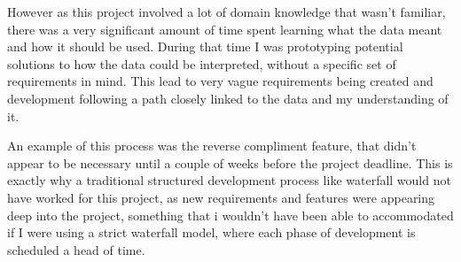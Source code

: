 However as this project involved a lot of domain knowledge that wasn't familiar, there was a very significant amount of time spent learning what the data meant and how it should be used. During that time I was prototyping potential solutions to how the data could be interpreted, without a specific set of requirements in mind. This lead to very vague requirements being created and development following a path closely linked to the data and my understanding of it. 

An example of this process was the reverse compliment feature, that didn't appear to be necessary until a couple of weeks before the project deadline. This is exactly why a traditional structured development process like waterfall would not have worked for this project, as new requirements and features were appearing deep into the project, something that i wouldn't have been able to accommodated if I were using a strict waterfall model, where each phase of development is scheduled a head of time.


